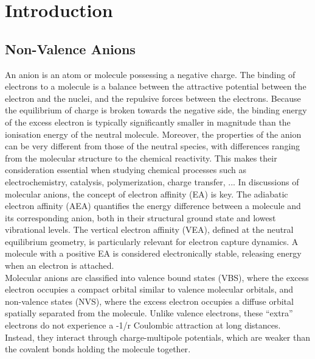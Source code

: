 \chapter{Introduction}\label{ch:introduction}

\section{Non-Valence Anions}
An anion is an atom or molecule possessing a negative charge\cite{simons2008molecular,simons2023molecular,simons2011theoretical,herbert2015quantum}. The binding of electrons to a molecule is a balance between the attractive potential between the electron and the nuclei, and the repulsive forces between the electrons. Because the equilibrium of charge is broken towards the negative side, the binding energy of the excess electron is typically significantly smaller in magnitude than the ionisation energy of the neutral molecule. Moreover, the properties of the anion can be very different from those of the neutral species, with differences ranging from the molecular structure to the chemical reactivity. This makes their consideration essential when studying chemical processes such as electrochemistry, catalysis, polymerization, charge transfer, ... In discussions of molecular anions, the concept of electron affinity (EA) is key. The adiabatic electron affinity (AEA) quantifies the energy difference between a molecule and its corresponding anion, both in their structural ground state and lowest vibrational levels. The vertical electron affinity (VEA), defined at the neutral equilibrium geometry, is particularly relevant for electron capture dynamics. A molecule with a positive EA is considered electronically stable, releasing energy when an electron is attached\cite{simons2008molecular}.\\

Molecular anions are classified into valence bound states (VBS), where the excess electron occupies a compact orbital similar to valence molecular orbitals, and non-valence states (NVS), where the excess electron occupies a diffuse orbital spatially separated from the molecule. Unlike valence electrons, these ``extra'' electrons do not experience a -1/r Coulombic attraction at long distances. Instead, they interact through charge-multipole potentials, which are weaker than the covalent bonds holding the molecule together\cite{simons2008molecular,herbert2015quantum}.\\

